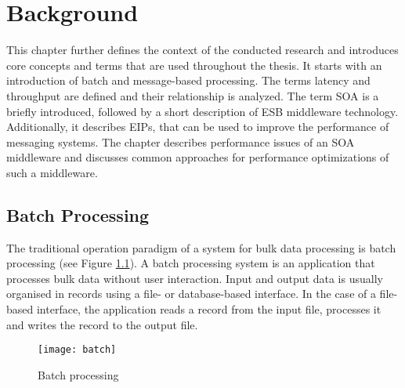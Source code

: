 \chapter{Background}\label{ch:background}

This chapter further defines the context of the conducted research and introduces core concepts and terms that are used throughout the thesis. It starts with an introduction of batch and message-based processing. The terms latency and throughput are defined and their relationship is analyzed. 
The term \ac{SOA} is a briefly introduced, followed by a short description of \ac{ESB} middleware technology. Additionally, it describes \acp{EIP}, that can be used to improve the performance of messaging systems. The chapter describes performance issues of an \ac{SOA} middleware and discusses common approaches for performance optimizations of such a middleware.

\section{Batch Processing}\label{sec:batch_processing}
The traditional operation paradigm of a system for bulk data processing is batch processing (see Figure \ref{fig:batch_processing}). A batch processing system is an application that processes bulk data without user interaction. Input and output data is usually organised in records using a file- or database-based interface. In the case of a file-based interface, the application reads a record from the input file, processes it and writes the record to the output file.
\begin{figure}[htbp]
	\centering
	\texttt{[image: batch]}
	\caption{Batch processing}
	\label{fig:batch_processing}
\end{figure}

